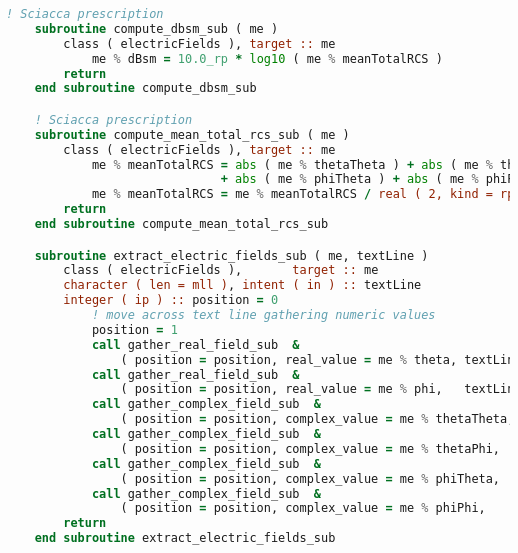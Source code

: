 {{\begin{lstlisting}[language=Fortran]
    ! Sciacca prescription
    subroutine compute_dbsm_sub ( me )
        class ( electricFields ), target :: me
            me % dBsm = 10.0_rp * log10 ( me % meanTotalRCS )
        return
    end subroutine compute_dbsm_sub

    ! Sciacca prescription
    subroutine compute_mean_total_rcs_sub ( me )
        class ( electricFields ), target :: me
            me % meanTotalRCS = abs ( me % thetaTheta ) + abs ( me % thetaPhi ) &
                              + abs ( me % phiTheta ) + abs ( me % phiPhi )
            me % meanTotalRCS = me % meanTotalRCS / real ( 2, kind = rp )
        return
    end subroutine compute_mean_total_rcs_sub

    subroutine extract_electric_fields_sub ( me, textLine )
        class ( electricFields ),       target :: me
        character ( len = mll ), intent ( in ) :: textLine
        integer ( ip ) :: position = 0
            ! move across text line gathering numeric values
            position = 1
            call gather_real_field_sub  &
                ( position = position, real_value = me % theta, textLine = textLine, fmt = "( f12.4 )" )
            call gather_real_field_sub  &
                ( position = position, real_value = me % phi,   textLine = textLine, fmt = "( f12.4 )" )
            call gather_complex_field_sub  &
                ( position = position, complex_value = me % thetaTheta, textLine = textLine )
            call gather_complex_field_sub  &
                ( position = position, complex_value = me % thetaPhi,   textLine = textLine )
            call gather_complex_field_sub  &
                ( position = position, complex_value = me % phiTheta,   textLine = textLine )
            call gather_complex_field_sub  &
                ( position = position, complex_value = me % phiPhi,     textLine = textLine )
        return
    end subroutine extract_electric_fields_sub


\end{lstlisting}}}

